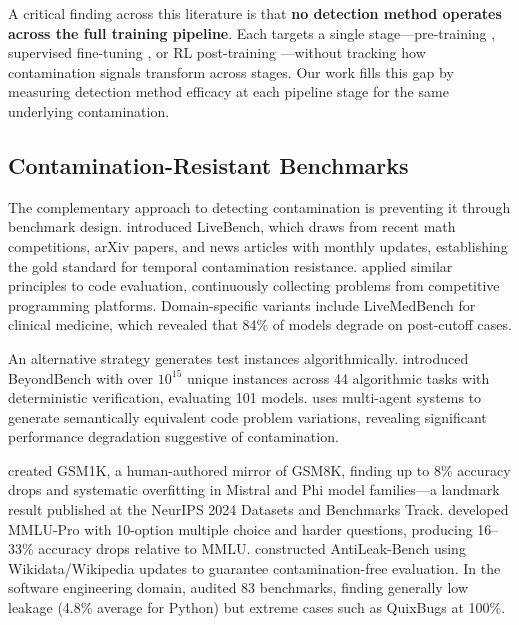 A critical finding across this literature is that \textbf{no detection method operates across the full training pipeline}. Each targets a single stage---pre-training \citep{shi2024detecting,zhang2025minkpp}, supervised fine-tuning \citep{fsd2024finetuning}, or RL post-training \citep{selfcritique2025rl}---without tracking how contamination signals transform across stages. Our work fills this gap by measuring detection method efficacy at each pipeline stage for the same underlying contamination.

\subsection{Contamination-Resistant Benchmarks}

The complementary approach to detecting contamination is preventing it through benchmark design. \citet{white2025livebench} introduced LiveBench, which draws from recent math competitions, arXiv papers, and news articles with monthly updates, establishing the gold standard for temporal contamination resistance. \citet{jain2024livecodebench} applied similar principles to code evaluation, continuously collecting problems from competitive programming platforms. Domain-specific variants include LiveMedBench \citep{livemedbench2026} for clinical medicine, which revealed that 84\% of models degrade on post-cutoff cases.

An alternative strategy generates test instances algorithmically. \citet{beyondbench2025} introduced BeyondBench with over $10^{15}$ unique instances across 44 algorithmic tasks with deterministic verification, evaluating 101 models. \citet{dycodeval2025} uses multi-agent systems to generate semantically equivalent code problem variations, revealing significant performance degradation suggestive of contamination.

\citet{zhang2024gsm1k} created GSM1K, a human-authored mirror of GSM8K, finding up to 8\% accuracy drops and systematic overfitting in Mistral and Phi model families---a landmark result published at the NeurIPS 2024 Datasets and Benchmarks Track. \citet{wang2024mmlupro} developed MMLU-Pro with 10-option multiple choice and harder questions, producing 16--33\% accuracy drops relative to MMLU. \citet{antileakbench2025} constructed AntiLeak-Bench using Wikidata/Wikipedia updates to guarantee contamination-free evaluation. In the software engineering domain, \citet{lessleak2025} audited 83 benchmarks, finding generally low leakage (4.8\% average for Python) but extreme cases such as QuixBugs at 100\%.

